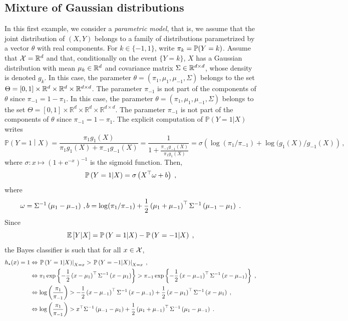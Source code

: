 \subsection{Mixture of Gaussian distributions}
In this first example, we consider a {\em parametric model}, that is, we assume that the joint distribution of $(X,Y)$ belongs to a family of distributions parametrized by a vector $\theta$ with real components. For $k\in\{-1,1\}$, write $\pi_k = \mathbb{P}(Y = k)$. Assume that $\mathcal{X} = \mathbb{R}^d$ and that, conditionally on the event $\{Y = k\}$, $X$ has a Gaussian distribution with mean $\mu_k \in\mathbb{R}^d$ and covariance matrix $\Sigma\in \mathbb{R}^{d\times d}$, whose density is denoted $g_k$. In this case, the parameter $\theta=(\pi_1, \mu_1,\mu_{-1}, \Sigma)$ belongs to the set $\Theta= [0,1] \times \mathbb{R}^d \times \mathbb{R}^d \times \mathbb{R}^{d \times d}$. The parameter $\pi_{-1}$ is not part of the components of $\theta$ since $\pi_{-1}=1-\pi_{1}$. In this case, the parameter $\theta=(\pi_1, \mu_1,\mu_{-1}, \Sigma)$ belongs to the set $\Theta= [0,1] \times \mathbb{R}^d \times \mathbb{R}^d \times \mathbb{R}^{d \times d}$. The parameter $\pi_{-1}$ is not part of the components of $\theta$ since $\pi_{-1}=1-\pi_{1}$. The explicit computation of $\mathbb{P}(Y=1 | X)$ writes
$$
\mathbb{P}\left(Y=1\middle | X\right) = \frac{\pi_1g_1(X)}{\pi_1g_1(X) + \pi_{-1}g_{-1}(X)} = \frac{1}{1 + \frac{\pi_{-1}g_{-1}(X)}{\pi_1g_1(X)}} = \sigma\left(\log(\pi_1/\pi_{-1}) + \log(g_1(X)/g_{-1}(X)\right)\,,
$$
where $\sigma: x\mapsto (1 + \mathrm{e}^{-x})^{-1}$ is the sigmoid function. Then,
\begin{equation}
\label{eq:prob:lda}
\mathbb{P}\left(Y=1\middle | X\right) = \sigma\left( X^\top\omega+ b\right)\;,
\end{equation}
where
$$
\omega =  \Sigma^{-1}\left(\mu_{1} - \mu_{-1}\right)\,,
b = \log(\pi_1/\pi_{-1}) +  \frac{1}{2}\left(\mu_{1}+\mu_{-1}\right)^\top\Sigma^{-1}\left(\mu_{-1}-\mu_{1}\right)\;.
$$
Since
\[
\mathbb{E}\left[Y\middle| X\right]  = \mathbb{P}\left(Y=1\middle | X\right) - \mathbb{P}\left(Y=-1\middle | X\right)\;,
\]
the Bayes classifier is such that for all $x\in \mathcal{X}$,
\begin{align*}
h_{\star}(x) = 1& \Leftrightarrow \left. \mathbb{P}\left(Y=1\middle | X\right)\right|_{X=x} > \left. \mathbb{P}\left(Y=-1\middle | X\right) \right|_{X=x}\;,\\
& \Leftrightarrow \pi_1 \exp\left\{-\frac{1}{2}\left(x-\mu_1\right)^\top\Sigma^{-1}\left(x-\mu_1\right)\right\} > \pi_{-1} \exp\left\{-\frac{1}{2}\left(x-\mu_{-1}\right)^\top\Sigma^{-1}\left(x-\mu_{-1}\right)\right\}\;,\\
& \Leftrightarrow \log\left(\frac{\pi_{1}}{\pi_{-1}}\right) > -\frac{1}{2}\left(x-\mu_{-1}\right)^\top\Sigma^{-1}\left(x-\mu_{-1}\right) + \frac{1}{2}\left(x-\mu_1\right)^\top\Sigma^{-1}\left(x-\mu_1\right)\;,\\
& \Leftrightarrow \log\left(\frac{\pi_{1}}{\pi_{-1}}\right) > x^\top \Sigma^{-1}\left(\mu_{-1} - \mu_{1}\right) + \frac{1}{2}\left(\mu_{1}+\mu_{-1}\right)^\top\Sigma^{-1}\left(\mu_{1}-\mu_{-1}\right)\;.
\end{align*}
